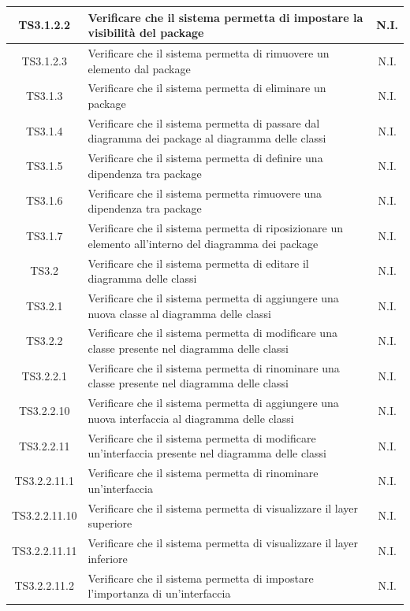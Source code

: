 \documentclass[../PianoDiQualifica.tex]{subfiles}
\begin{document}
\begin{longtable}{|c|>{\centering}p{10cm}|c|}
	\hline
	TS3.1.2.2 & Verificare che il sistema permetta di impostare la visibilità del package & N.I. \\
	\hline
	TS3.1.2.3 & Verificare che il sistema permetta di rimuovere un elemento dal package & N.I. \\
	\hline
	TS3.1.3 & Verificare che il sistema permetta di eliminare un package & N.I. \\
	\hline
	TS3.1.4 & Verificare che il sistema permetta di passare dal diagramma dei package al diagramma delle classi & N.I. \\
	\hline
	TS3.1.5 & Verificare che il sistema permetta di definire una dipendenza tra package & N.I. \\
	\hline
	TS3.1.6 & Verificare che il sistema permetta rimuovere una dipendenza tra package & N.I. \\
	\hline
	TS3.1.7 & Verificare che il sistema permetta di riposizionare un elemento all'interno del diagramma dei package & N.I. \\
	\hline
	TS3.2 & Verificare che il sistema permetta di editare il diagramma delle classi & N.I. \\
	\hline
	TS3.2.1 & Verificare che il sistema permetta di aggiungere una nuova classe al diagramma delle classi & N.I. \\
	\hline
	TS3.2.2 & Verificare che il sistema permetta di modificare una classe presente nel diagramma delle classi & N.I. \\
	\hline
	TS3.2.2.1 & Verificare che il sistema permetta di rinominare una classe presente nel diagramma delle classi & N.I. \\
	\hline
	TS3.2.2.10 & Verificare che il sistema permetta di aggiungere una nuova interfaccia al diagramma delle classi & N.I. \\
	\hline
	TS3.2.2.11 & Verificare che il sistema permetta di modificare un'interfaccia presente nel diagramma delle classi & N.I. \\
	\hline
	TS3.2.2.11.1 & Verificare che il sistema permetta di rinominare un'interfaccia & N.I. \\
	\hline
	TS3.2.2.11.10 & Verificare che il sistema permetta di visualizzare il layer superiore & N.I. \\
	\hline
	TS3.2.2.11.11 & Verificare che il sistema permetta di visualizzare il layer inferiore & N.I. \\
	\hline
	TS3.2.2.11.2 & Verificare che il sistema permetta di impostare l'importanza di un'interfaccia & N.I. \\
	\hline

\end{longtable}
\end{document}
